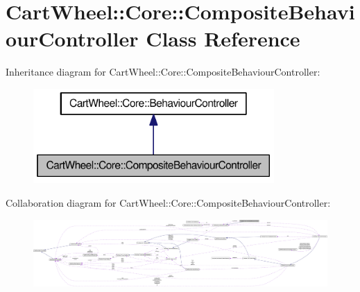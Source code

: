 \hypertarget{classCartWheel_1_1Core_1_1CompositeBehaviourController}{
\section{CartWheel::Core::CompositeBehaviourController Class Reference}
\label{classCartWheel_1_1Core_1_1CompositeBehaviourController}
}


Inheritance diagram for CartWheel::Core::CompositeBehaviourController:\nopagebreak
\begin{figure}[H]
\begin{center}
\leavevmode
\includegraphics[width=260pt]{classCartWheel_1_1Core_1_1CompositeBehaviourController__inherit__graph}
\end{center}
\end{figure}


Collaboration diagram for CartWheel::Core::CompositeBehaviourController:\nopagebreak
\begin{figure}[H]
\begin{center}
\leavevmode
\includegraphics[width=400pt]{classCartWheel_1_1Core_1_1CompositeBehaviourController__coll__graph}
\end{center}
\end{figure}
